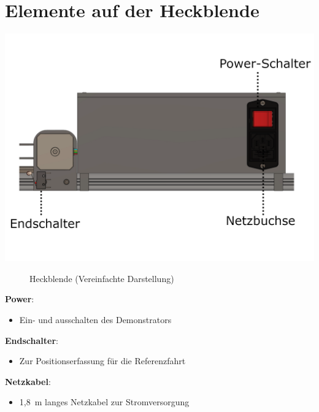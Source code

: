 %
%

\chapter{Elemente auf der Heckblende}
\begin{center}
	
	\includegraphics[width=\textwidth]{Images/Konstruktion3.png}
\end{center}
\begin{figure}[htb]
	\begin{center}
		
		\caption{Heckblende (Vereinfachte Darstellung)} 
		\label{Heckblende}
	\end{center}
\end{figure}
\textbf{Power}: 
\begin{itemize}
	\item Ein- und ausschalten des Demonstrators
\end{itemize}

\textbf{Endschalter}: 
\begin{itemize}
	\item Zur Positionserfassung für die Referenzfahrt
\end{itemize}

\textbf{Netzkabel}: 
\begin{itemize}
	\item 1,8\ m langes Netzkabel zur Stromversorgung
\end{itemize}
